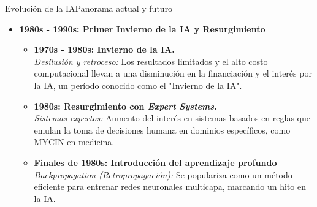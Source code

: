 \documentclass[10pt,border=3pt,tikz]{beamer}
\begin{document}
    \begin{frame}{Evolución de la IA}{Panorama actual y futuro}
        \begin{itemize}
            \item \textbf{1980s - 1990s: Primer Invierno de la IA y Resurgimiento}
            \begin{itemize}
                \item \textbf{1970s - 1980s: Invierno de la IA.} \\\textit{Desilusión y retroceso:} Los resultados limitados y el alto costo computacional llevan a una disminución en la financiación y el interés por la IA, un período conocido como el "Invierno de la IA".
                
                \item \textbf{1980s: Resurgimiento con \textit{Expert Systems}.} \\\textit{Sistemas expertos:} Aumento del interés en sistemas basados en reglas que emulan la toma de decisiones humana en dominios específicos, como MYCIN en medicina.
                
                
                \item \textbf{Finales de 1980s: Introducción del aprendizaje profundo} \\\textit{Backpropagation (Retropropagación):} Se populariza como un método eficiente para entrenar redes neuronales multicapa, marcando un hito en la IA.
            \end{itemize}
        \end{itemize}
    \end{frame}
    
\end{document}
